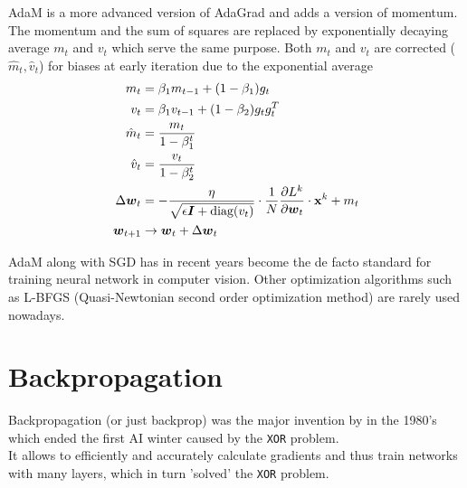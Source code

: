 AdaM is a more advanced version of AdaGrad and adds a version of momentum.
The momentum and the sum of squares are replaced by exponentially decaying average $m_t$ and $v_t$ which serve the same purpose.
Both $m_t$ and $v_t$ are corrected ($\hat{m}_t, \hat{v}_t$) for biases at early iteration due to the exponential average
\begin{align}
    m_t & = \beta_1 m_{t-1} + (1 - \beta_1) g_t \\
    v_t & = \beta_1 v_{t-1} + (1 - \beta_2) g_t g_t^T \\
    \hat{m}_t & = \frac{m_t}{1 - \beta_1^t} \\
    \hat{v}_t & = \frac{v_t}{1 - \beta_2^t} \\
    \Delta \boldsymbol{w}_t & = - \frac{\eta}{\sqrt{\epsilon \boldsymbol{I} + \text{diag}(v_t)}} \cdot \frac{1}{N} \frac{\partial L^k}{\partial \boldsymbol{w}_t} \cdot \mathbf{x}^k + m_t \\
    \boldsymbol{w}_{t+1} & \rightarrow \boldsymbol{w}_t + \Delta \boldsymbol{w}_t
\end{align}

AdaM along with SGD has in recent years become the de facto standard for training neural network in computer vision.
Other optimization algorithms such as L-BFGS (Quasi-Newtonian second order optimization method) are rarely used nowadays.




\section{Backpropagation}
Backpropagation (or just backprop) was the major invention by \citeauthor{backprop} in the 1980's which ended the first AI winter caused by the \lstinline|XOR| problem. \\
It allows to efficiently and accurately calculate gradients and thus train networks with many layers, which in turn 'solved' the \lstinline|XOR| problem.


